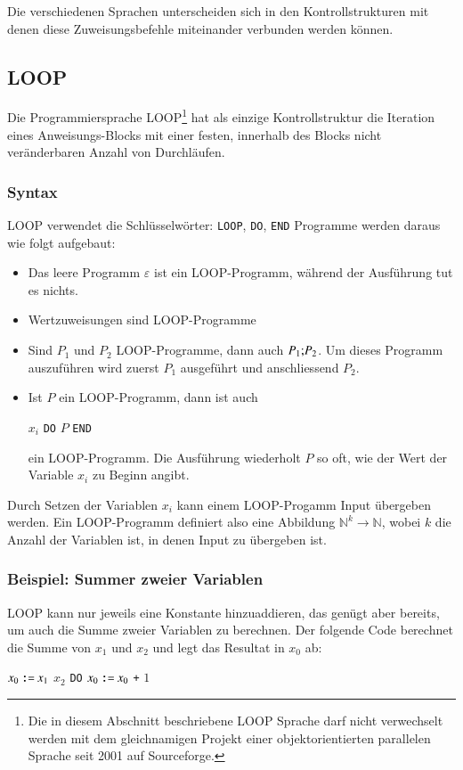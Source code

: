 Die verschiedenen Sprachen unterscheiden sich in den Kontrollstrukturen
mit denen diese Zuweisungsbefehle miteinander verbunden werden können.

\subsection{LOOP}
%
Die Programmiersprache
LOOP\footnote{Die in diesem Abschnitt beschriebene
LOOP Sprache darf nicht verwechselt werden mit dem gleichnamigen
Projekt einer objektorientierten parallelen Sprache seit
2001 auf Sourceforge.}
hat als einzige Kontrollstruktur die
Iteration eines Anweisungs-Blocks mit einer festen, innerhalb des
Blocks nicht veränderbaren Anzahl von Durchläufen.

\subsubsection{Syntax}
LOOP verwendet die 
Schlüsselwörter: {\tt LOOP}, {\tt DO}, {\tt END}
Programme werden daraus wie folgt aufgebaut:
\begin{itemize}
\item Das leere Programm $\varepsilon$ ist ein LOOP-Programm,
während der Ausführung tut es nichts.
\item Wertzuweisungen sind LOOP-Programme
\item Sind $P_1$ und $P_2$ LOOP-Programme, dann auch
$P_1{\tt ;}P_2$. Um dieses Programm auszuführen wird zuerst $P_1$
ausgeführt und anschliessend $P_2$.
\item Ist $P$ ein LOOP-Programm, dann ist auch
\begin{algorithmic}
 $x_i$ {\tt DO} $P$ {\tt END}
\end{algorithmic}
ein LOOP-Programm. Die Ausführung wiederholt $P$ so oft, wie der
Wert der Variable $x_i$  zu Beginn angibt.
\end{itemize}
Durch Setzen der Variablen $x_i$ kann einem LOOP-Progamm Input übergeben
werden.
Ein LOOP-Programm definiert also eine Abbildung $\mathbb N^k\to\mathbb N$,
wobei $k$ die Anzahl der Variablen ist, in denen Input zu übergeben ist.

\subsubsection{Beispiel: Summer zweier Variablen}
LOOP kann nur jeweils eine Konstante hinzuaddieren, das genügt aber
bereits, um auch die Summe zweier Variablen zu berechnen. Der folgende
Code berechnet die Summe von $x_1$ und $x_2$ und legt das Resultat in
$x_0$ ab:
\begin{algorithmic}
\STATE $x_0 \mathbin{\texttt{:=}} x_1$
 $x_2$ {\tt DO}
\STATE{\tt \ \ \ \ }$x_0 \mathbin{\texttt{:=}} x_0$ {\tt +} $1$
\end{algorithmic}

